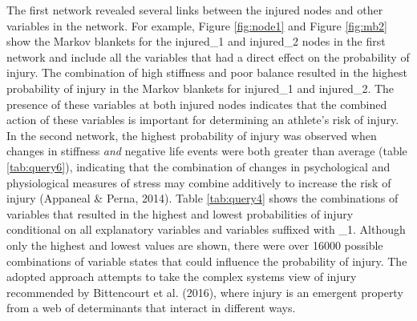 \documentclass[
  english,
  man,floatsintext]{apa6}
\begin{document}
The first network revealed several links between the injured nodes and other variables in the network.
For example, Figure \ref{fig:node1} and Figure \ref{fig:mb2} show the Markov blankets for the injured\_1 and injured\_2 nodes in the first network and include all the variables that had a direct effect on the probability of injury.
The combination of high stiffness and poor balance resulted in the highest probability of injury in the Markov blankets for injured\_1 and injured\_2.
The presence of these variables at both injured nodes indicates that the combined action of these variables is important for determining an athlete's risk of injury.
In the second network, the highest probability of injury was observed when changes in stiffness \emph{and} negative life events were both greater than average (table \ref{tab:query6}), indicating that the combination of changes in psychological and physiological measures of stress may combine additively to increase the risk of injury (Appaneal \& Perna, 2014).
Table \ref{tab:query4} shows the combinations of variables that resulted in the highest and lowest probabilities of injury conditional on all explanatory variables and variables suffixed with \_1.
Although only the highest and lowest values are shown, there were over 16000 possible combinations of variable states that could influence the probability of injury.
The adopted approach attempts to take the complex systems view of injury recommended by Bittencourt et al. (2016), where injury is an emergent property from a web of determinants that interact in different ways.
\end{document}
